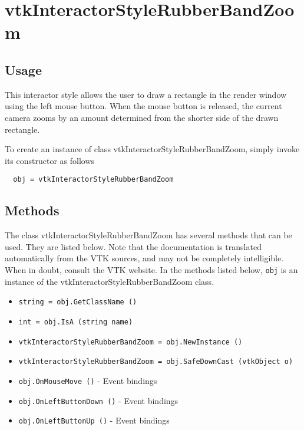 \section{vtkInteractorStyleRubberBandZoom}

\subsection{Usage}

 This interactor style allows the user to draw a rectangle in the render
 window using the left mouse button.  When the mouse button is released,
 the current camera zooms by an amount determined from the shorter side of
 the drawn rectangle.

To create an instance of class vtkInteractorStyleRubberBandZoom, simply
invoke its constructor as follows
\begin{verbatim}
  obj = vtkInteractorStyleRubberBandZoom
\end{verbatim}
\subsection{Methods}

The class vtkInteractorStyleRubberBandZoom has several methods that can be used.
  They are listed below.
Note that the documentation is translated automatically from the VTK sources,
and may not be completely intelligible.  When in doubt, consult the VTK website.
In the methods listed below, \verb|obj| is an instance of the vtkInteractorStyleRubberBandZoom class.
\begin{itemize}
\item  \verb|string = obj.GetClassName ()|

\item  \verb|int = obj.IsA (string name)|

\item  \verb|vtkInteractorStyleRubberBandZoom = obj.NewInstance ()|

\item  \verb|vtkInteractorStyleRubberBandZoom = obj.SafeDownCast (vtkObject o)|

\item  \verb|obj.OnMouseMove ()| -  Event bindings

\item  \verb|obj.OnLeftButtonDown ()| -  Event bindings

\item  \verb|obj.OnLeftButtonUp ()| -  Event bindings

\end{itemize}
